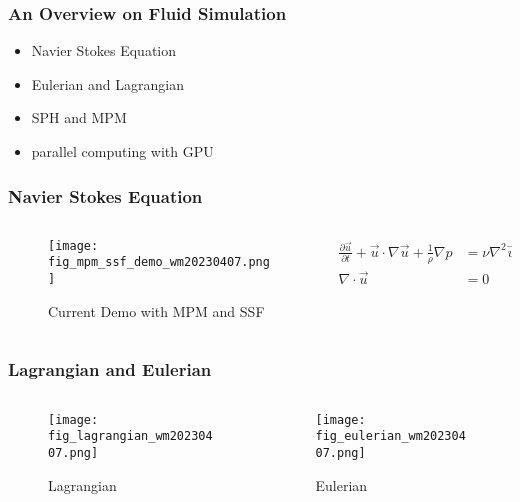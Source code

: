 
\begin{frame}
    \frametitle{An Overview on Fluid Simulation}
    \begin{itemize}
        \item Navier Stokes Equation
        \item Eulerian and Lagrangian
        \item SPH and MPM
        \item parallel computing with GPU
    \end{itemize}
\end{frame}

\begin{frame}
    \frametitle{Navier Stokes Equation}
    \begin{columns}[c]
        \begin{column}{0.45\textwidth} %
            \begin{figure}
                \texttt{[image: fig\_mpm\_ssf\_demo\_wm20230407.png]}
                \caption[short]{Current Demo with MPM and SSF}
            \end{figure}
        \end{column}
        \begin{column}{0.5\textwidth} %
            \begin{equation}
                \begin{aligned}
                    \frac{\partial \vec{u}}{\partial t} + \vec{u}\cdot \nabla \vec{u} + \frac{1}{\rho}\nabla p & = \nu \nabla^2 \vec{u} + \vec{g} \\
                    \nabla \cdot \vec{u}                                                                       & = 0
                \end{aligned}
            \end{equation}
        \end{column}
    \end{columns}

\end{frame}

\begin{frame}
    \frametitle{Lagrangian and Eulerian }
    \begin{columns}[c]
        \begin{column}{0.48\textwidth} %
            \begin{figure}
                \texttt{[image: fig\_lagrangian\_wm20230407.png]}
                \caption{Lagrangian}
            \end{figure}
        \end{column}
        \begin{column}{0.48\textwidth} %
            \begin{figure}
                \texttt{[image: fig\_eulerian\_wm20230407.png]}
                \caption{Eulerian}
            \end{figure}
        \end{column}
    \end{columns}
\end{frame}

